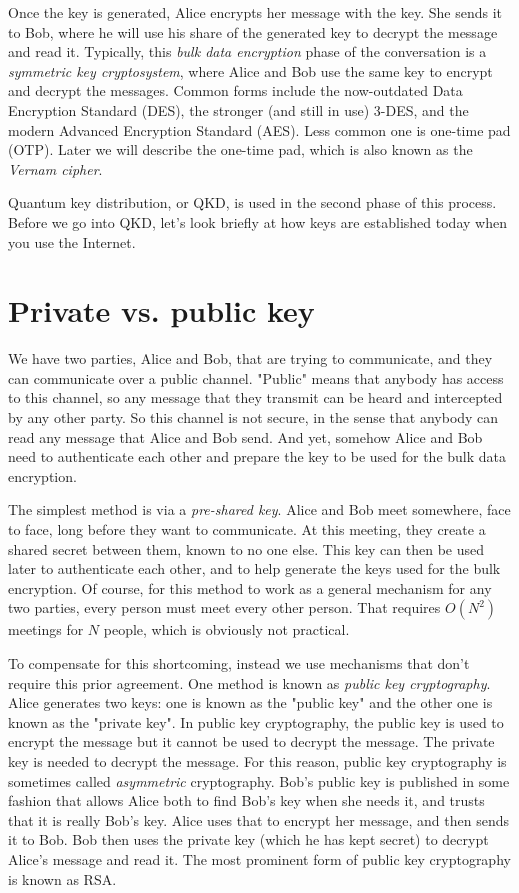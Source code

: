 Once the key is generated, Alice encrypts her message with the key. She sends it to Bob, where he will use his share of the generated key to decrypt the message and read it.  Typically, this \emph{bulk data encryption} phase of the conversation is a \emph{symmetric key cryptosystem}, where Alice and Bob use the same key to encrypt and decrypt the messages. Common forms include the now-outdated Data Encryption Standard (DES), the stronger (and still in use) 3-DES, and the modern Advanced Encryption Standard (AES). Less common one is one-time pad (OTP). Later we will describe the one-time pad, which is also known as the \emph{Vernam cipher}.

Quantum key distribution, or QKD, is used in the second phase of this process.  Before we go into QKD, let's look briefly at how keys are established today when you use the Internet.

\section{Private vs. public key}

We have two parties, Alice and Bob, that are trying to communicate, and they can communicate over a public channel. "Public" means that anybody has access to this channel, so any message that they transmit can be heard and intercepted by any other party. So this channel is not secure, in the sense that anybody can read any message that Alice and Bob send. And yet, somehow Alice and Bob need to authenticate each other and prepare the key to be used for the bulk data encryption.

The simplest method is via a \emph{pre-shared key}. Alice and Bob meet somewhere, face to face, long before they want to communicate.  At this meeting, they create a shared secret between them, known to no one else.  This key can then be used later to authenticate each other, and to help generate the keys used for the bulk encryption.  Of course, for this method to work as a general mechanism for any two parties, every person must meet every other person.  That requires $O(N^2)$ meetings for $N$ people, which is obviously not practical.

To compensate for this shortcoming, instead we use mechanisms that don't require this prior agreement. One method is known as \emph{public key cryptography}. Alice generates two keys: one is known as the "public key" and the other one is known as the "private key".  In public key cryptography, the public key is used to encrypt the message but it cannot be used to decrypt the message. 
The private key is needed to decrypt the message.  For this reason, public key cryptography is sometimes called \emph{asymmetric} cryptography.  Bob's public key is published in some fashion that allows Alice both to find Bob's key when she needs it, and trusts that it is really Bob's key.  Alice uses that to encrypt her message, and then sends it to Bob. Bob then uses the private key (which he has kept secret) to decrypt Alice's message and read it.  The most prominent form of public key cryptography is known as RSA.

